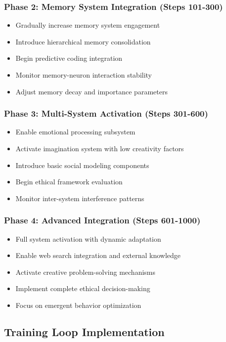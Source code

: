 \documentclass[11pt,a4paper]{article}
\begin{document}
\subsubsection{Phase 2: Memory System Integration (Steps 101-300)}
\begin{itemize}[leftmargin=0.5in]
    \item Gradually increase memory system engagement
    \item Introduce hierarchical memory consolidation
    \item Begin predictive coding integration
    \item Monitor memory-neuron interaction stability
    \item Adjust memory decay and importance parameters
\end{itemize}

\subsubsection{Phase 3: Multi-System Activation (Steps 301-600)}
\begin{itemize}[leftmargin=0.5in]
    \item Enable emotional processing subsystem
    \item Activate imagination system with low creativity factors
    \item Introduce basic social modeling components
    \item Begin ethical framework evaluation
    \item Monitor inter-system interference patterns
\end{itemize}

\subsubsection{Phase 4: Advanced Integration (Steps 601-1000)}
\begin{itemize}[leftmargin=0.5in]
    \item Full system activation with dynamic adaptation
    \item Enable web search integration and external knowledge
    \item Activate creative problem-solving mechanisms
    \item Implement complete ethical decision-making
    \item Focus on emergent behavior optimization
\end{itemize}

\subsection{Training Loop Implementation}
\end{document}
